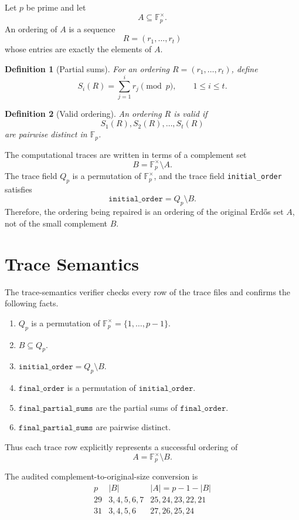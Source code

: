 \documentclass[11pt]{article}
\newtheorem{definition}{Definition}
\newcommand{\Fp}{\mathbb{F}_p}
\newcommand{\Fpx}{\mathbb{F}_p^\times}
\begin{document}
Let \(p\) be prime and let
\[
A\subseteq \Fpx.
\]
An ordering of \(A\) is a sequence
\[
R=(r_1,\ldots,r_t)
\]
whose entries are exactly the elements of \(A\).

\begin{definition}[Partial sums]
For an ordering \(R=(r_1,\ldots,r_t)\), define
\[
S_i(R)=\sum_{j=1}^{i}r_j \pmod p,
\qquad
1\le i\le t.
\]
\end{definition}

\begin{definition}[Valid ordering]
An ordering \(R\) is valid if
\[
S_1(R),S_2(R),\ldots,S_t(R)
\]
are pairwise distinct in \(\Fp\).
\end{definition}

The computational traces are written in terms of a complement set
\[
B=\Fpx\setminus A.
\]
The trace field \(Q_p\) is a permutation of \(\Fpx\), and the trace field \texttt{initial\_order} satisfies
\[
\texttt{initial\_order}=Q_p\setminus B.
\]
Therefore, the ordering being repaired is an ordering of the original Erd\H{o}s set \(A\), not of the small complement \(B\).

\section{Trace Semantics}

The trace-semantics verifier checks every row of the trace files and confirms the following facts.

\begin{enumerate}[label=(\roman*)]
\item \(Q_p\) is a permutation of \(\Fpx=\{1,\ldots,p-1\}\).
\item \(B\subseteq Q_p\).
\item \(\texttt{initial\_order}=Q_p\setminus B\).
\item \(\texttt{final\_order}\) is a permutation of \(\texttt{initial\_order}\).
\item \(\texttt{final\_partial\_sums}\) are the partial sums of \(\texttt{final\_order}\).
\item \(\texttt{final\_partial\_sums}\) are pairwise distinct.
\end{enumerate}

Thus each trace row explicitly represents a successful ordering of
\[
A=\Fpx\setminus B.
\]

The audited complement-to-original-size conversion is
\[
\begin{array}{c|c|c}
p & |B| & |A|=p-1-|B|\\
\hline
29 & 3,4,5,6,7 & 25,24,23,22,21\\
31 & 3,4,5,6 & 27,26,25,24
\end{array}
\]
\end{document}
